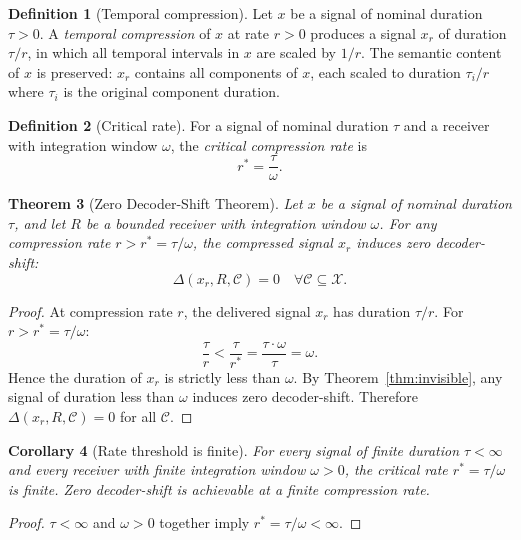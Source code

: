 \documentclass[twocolumn,11pt,a4paper]{article}
\theoremstyle{main}
\newtheorem{theorem}{Theorem}[section]
\newtheorem{corollary}[theorem]{Corollary}
\theoremstyle{definition}
\newtheorem{definition}[theorem]{Definition}
\theoremstyle{remark}
\newcommand{\Out}{\mathcal{X}}
\newcommand{\Cell}{\mathcal{C}}
\newcommand{\Recv}{R}
\newcommand{\shift}{\Delta}
\newcommand{\rate}{r}
\newcommand{\window}{\omega}
\begin{document}
\begin{definition}[Temporal compression]
\label{def:compression}
Let $x$ be a signal of nominal duration $\tau > 0$. A
\emph{temporal compression} of $x$ at rate $\rate > 0$ produces a
signal $x_\rate$ of duration $\tau / \rate$, in which all temporal
intervals in $x$ are scaled by $1/\rate$. The semantic content of $x$
is preserved: $x_\rate$ contains all components of $x$, each scaled to
duration $\tau_i / \rate$ where $\tau_i$ is the original component
duration.
\end{definition}

\begin{definition}[Critical rate]
\label{def:critical}
For a signal of nominal duration $\tau$ and a receiver with integration
window $\window$, the \emph{critical compression rate} is
\[
  \rate^* = \frac{\tau}{\window}.
\]
\end{definition}

\begin{theorem}[Zero Decoder-Shift Theorem]
\label{thm:zero}
Let $x$ be a signal of nominal duration $\tau$, and let $\Recv$ be a
bounded receiver with integration window $\window$. For any compression
rate $\rate > \rate^* = \tau / \window$, the compressed signal
$x_\rate$ induces zero decoder-shift:
\[
  \shift(x_\rate, \Recv, \Cell) = 0 \quad \forall \Cell \subseteq \Out.
\]
\end{theorem}

\begin{proof}
At compression rate $\rate$, the delivered signal $x_\rate$ has duration
$\tau / \rate$. For $\rate > \rate^* = \tau / \window$:
\[
  \frac{\tau}{\rate} < \frac{\tau}{\rate^*} = \frac{\tau \cdot \window}{\tau} = \window.
\]
Hence the duration of $x_\rate$ is strictly less than $\window$.
By Theorem~\ref{thm:invisible}, any signal of duration less than
$\window$ induces zero decoder-shift. Therefore
$\shift(x_\rate, \Recv, \Cell) = 0$ for all $\Cell$.
\end{proof}

\begin{corollary}[Rate threshold is finite]
\label{cor:finite}
For every signal of finite duration $\tau < \infty$ and every receiver
with finite integration window $\window > 0$, the critical rate
$\rate^* = \tau / \window$ is finite. Zero decoder-shift is achievable
at a finite compression rate.
\end{corollary}

\begin{proof}
$\tau < \infty$ and $\window > 0$ together imply $\rate^* = \tau /
\window < \infty$.
\end{proof}
\end{document}
